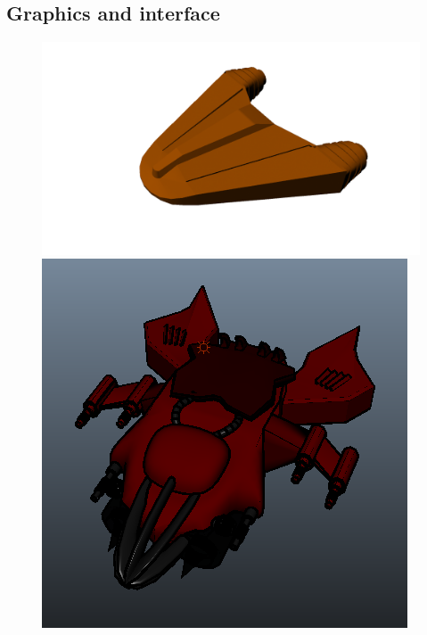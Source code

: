 \documentclass[11pt,a4paper]{article}
\begin{document}
       \subsection{Graphics and interface}

\begin{figure}[!htbp]
  \centering
  \begin{minipage}[b]{0.2\textwidth}
        \includegraphics[scale=0.2]{logos/file2.png}
  \end{minipage}
  \hfill
  \begin{minipage}[b]{0.2\textwidth}
        \includegraphics[scale=0.2]{logos/file11.png}
  \end{minipage}
  \hfill
  \begin{minipage}[b]{0.2\textwidth}

\end{minipage}
\end{figure}
\end{document}
